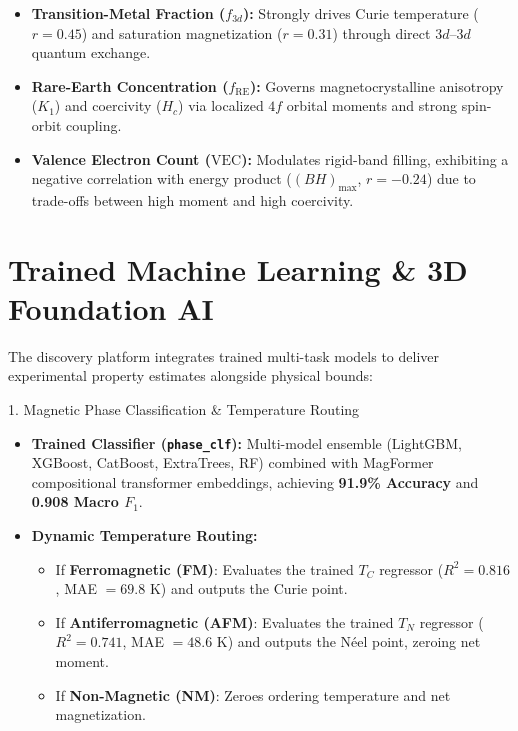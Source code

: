 \documentclass[10.5pt,a4paper]{article}
\begin{document}
\begin{itemize}[leftmargin=*]
  \item \textbf{Transition-Metal Fraction ($f_{3d}$):} Strongly drives Curie temperature ($r = 0.45$) and saturation magnetization ($r = 0.31$) through direct $3d\text{--}3d$ quantum exchange.
  \item \textbf{Rare-Earth Concentration ($f_{\text{RE}}$):} Governs magnetocrystalline anisotropy ($K_1$) and coercivity ($H_c$) via localized $4f$ orbital moments and strong spin-orbit coupling.
  \item \textbf{Valence Electron Count ($\text{VEC}$):} Modulates rigid-band filling, exhibiting a negative correlation with energy product ($(BH)_{\max}$, $r = -0.24$) due to trade-offs between high moment and high coercivity.
\end{itemize}

\section{Trained Machine Learning \& 3D Foundation AI}

The discovery platform integrates trained multi-task models to deliver experimental property estimates alongside physical bounds:

\begin{infobox}{1. Magnetic Phase Classification \& Temperature Routing}
\begin{itemize}[leftmargin=*]
  \item \textbf{Trained Classifier (\texttt{phase\_clf}):} Multi-model ensemble (LightGBM, XGBoost, CatBoost, ExtraTrees, RF) combined with MagFormer compositional transformer embeddings, achieving \textbf{91.9\% Accuracy} and \textbf{0.908 Macro $F_1$}.
  \item \textbf{Dynamic Temperature Routing:}
  \begin{itemize}
    \item If \textbf{Ferromagnetic (FM)}: Evaluates the trained $T_C$ regressor ($R^2 = 0.816$, MAE $= 69.8\text{ K}$) and outputs the Curie point.
    \item If \textbf{Antiferromagnetic (AFM)}: Evaluates the trained $T_N$ regressor ($R^2 = 0.741$, MAE $= 48.6\text{ K}$) and outputs the Néel point, zeroing net moment.
    \item If \textbf{Non-Magnetic (NM)}: Zeroes ordering temperature and net magnetization.
  \end{itemize}
\end{itemize}
\end{infobox}
\end{document}
